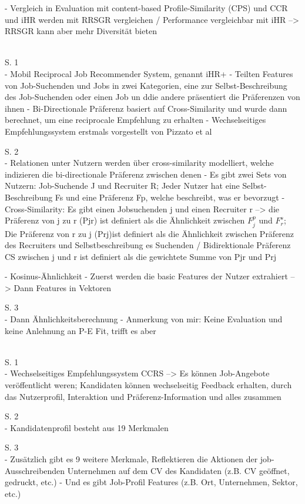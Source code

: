 - Vergleich in Evaluation mit content-based Profile-Similarity (CPS) und CCR und iHR werden mit RRSGR vergleichen / Performance vergleichbar mit iHR --> RRSGR kann aber mehr Diversität bieten

\textcite{wenxing:2015}\\
S. 1\\
- Mobil Reciprocal Job Recommender System, genannt iHR+
- Teilten Features von Job-Suchenden und Jobs in zwei Kategorien, eine zur Selbst-Beschreibung des Job-Suchenden oder einen Job un ddie andere präsentiert die Präferenzen von ihnen
- Bi-Directionale Präferenz basiert auf Cross-Similarity und wurde dann berechnet, um eine reciprocale Empfehlung zu erhalten
- Wechselseitiges Empfehlungssystem erstmals vorgestellt von Pizzato et al

S. 2\\
- Relationen unter Nutzern werden über cross-similarity modelliert, welche indizieren die bi-directionale Präferenz zwischen denen
- Es gibt zwei Sets von Nutzern: Job-Suchende J und Recruiter R; Jeder Nutzer hat eine Selbst-Beschreibung Fs und eine Präferenz Fp, welche beschreibt, was er bevorzugt
- Cross-Similarity: Es gibt einen Jobsuchenden j und einen Recruiter r --> die Präferenz von j zu r (Pjr) ist definiert als die Ähnlichkeit zwischen $F_j^p$ und $F_r^s$; Die Präferenz von r zu j (Prj)ist definiert als die Ähnlichkeit zwischen Präferenz des Recruiters und Selbstbeschreibung es Suchenden / Bidirektionale Präferenz CS zwischen j und r ist definiert als die gewichtete Summe von Pjr und Prj

- Kosinus-Ähnlichkeit
- Zuerst werden die basic Features der Nutzer extrahiert --> Dann Features in Vektoren

S. 3\\
- Dann Ähnlichkeitsberechnung
- Anmerkung von mir: Keine Evaluation und keine Anlehnung an P-E Fit, trifft es aber

\textcite{oezcan:2016}\\
S. 1\\
- Wechselseitiges Empfehlungssystem CCRS --> Es können Job-Angebote veröffentlicht weren; Kandidaten können wechselseitig Feedback erhalten, durch das Nutzerprofil, Interaktion und Präferenz-Information und alles zusammen

S. 2\\
- Kandidatenprofil besteht aus 19 Merkmalen

S. 3\\
- Zusätzlich gibt es 9 weitere Merkmale, Reflektieren die Aktionen der job-Ausschreibenden Unternehmen auf dem CV des Kandidaten (z.B. CV geöffnet, gedruckt, etc.)
- Und es gibt Job-Profil Features (z.B. Ort, Unternehmen, Sektor, etc.)

